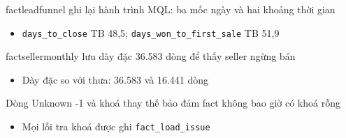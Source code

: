 \begin{frame}{factleadfunnel ghi lại hành trình MQL: ba mốc ngày và hai khoảng thời gian}
\begin{itemize}
  \item \texttt{days\_\allowbreak{}to\_\allowbreak{}close} TB 48,5; \texttt{days\_\allowbreak{}won\_\allowbreak{}to\_\allowbreak{}first\_\allowbreak{}sale} TB 51,9
\end{itemize}

\end{frame}

\begin{frame}{factsellermonthly lưu dày đặc 36.583 dòng để thấy seller ngừng bán}
\begin{itemize}
  \item Dày đặc so với thưa: 36.583 và 16.441 dòng
\end{itemize}

\end{frame}

\begin{frame}{Dòng Unknown -1 và khoá thay thế bảo đảm fact không bao giờ có khoá rỗng}
\begin{itemize}
  \item Mọi lỗi tra khoá được ghi \texttt{fact\_\allowbreak{}load\_\allowbreak{}issue}
\end{itemize}

\end{frame}
